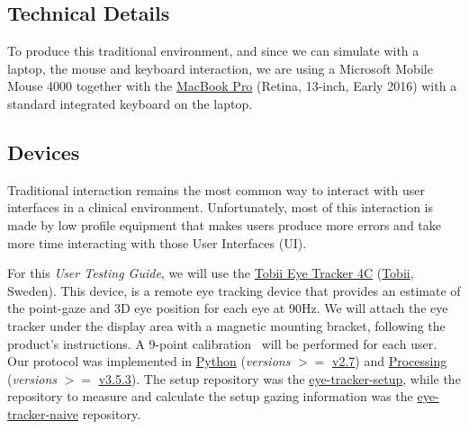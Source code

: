 \subsection{Technical Details}

To produce this traditional environment, and since we can simulate with a laptop, the mouse and keyboard interaction, we are using a Microsoft Mobile Mouse 4000 together with the \hyperlink{https://www.apple.com/shop/buy-mac/macbook-pro}{MacBook Pro} (Retina, 13-inch, Early 2016) with a standard integrated keyboard on the laptop.


\subsection{Devices}

Traditional interaction remains the most common way to interact with user interfaces in a clinical environment. Unfortunately, most of this interaction is made by low profile equipment that makes users produce more errors and take more time interacting with those User Interfaces (UI).

For this \textit{User Testing Guide}, we will use the \hyperlink{https://gaming.tobii.com/product/tobii-eye-tracker-4c/}{Tobii Eye Tracker 4C} (\hyperlink{https://www.tobii.com/}{Tobii}, Sweden). This device, is a remote eye tracking device that provides an estimate of the point-gaze and 3D eye position for each eye at 90Hz. We will attach the eye tracker under the display area with a magnetic mounting bracket, following the product's instructions. A 9-point calibration~\cite{chatelain2018evaluation} will be performed for each user. Our protocol was implemented in \hyperlink{https://www.python.org/}{Python} (\textit{versions} $>=$ \hyperlink{https://docs.python.org/2/}{v2.7}) and \hyperlink{http://www.processing.org/}{Processing} (\textit{versions} $>=$ \hyperlink{https://github.com/processing/processing/releases/tag/processing-0269-3.5.3}{v3.5.3}). The setup repository was the \hyperlink{https://github.com/mida-project/eye-tracker-setup}{eye-tracker-setup}, while the repository to measure and calculate the setup gazing information was the \hyperlink{https://github.com/mida-project/eye-tracker-naive}{eye-tracker-naive} repository.

